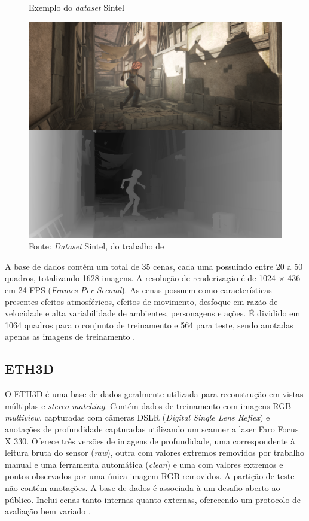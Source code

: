 \begin{figure}[h]
    \centering
    \caption{Exemplo do \textit{dataset} Sintel}
    \includegraphics[width=.6\textwidth]{fig/sintel_example.png}
    \caption*{Fonte: \textit{Dataset} Sintel, do trabalho de }
    \label{fig:sintelexample}
\end{figure}


A base de dados contém um total de 35 cenas, cada uma possuindo entre 20 a 50 quadros, totalizando 1628 imagens. A resolução de renderização é de 1024 $\times$ 436 em 24 FPS (\textit{Frames Per Second}). As cenas possuem como características presentes efeitos atmosféricos, efeitos de movimento, desfoque em razão de velocidade e alta variabilidade de ambientes, personagens e ações. É dividido em 1064 quadros para o conjunto de treinamento e 564 para teste, sendo anotadas apenas as imagens de treinamento \cite{wulff2012lessons}. 



\subsection{ETH3D}

O ETH3D é uma base de dados geralmente utilizada para reconstrução em vistas múltiplas e \textit{stereo matching}. Contém dados de treinamento com imagens RGB \textit{multiview}, capturadas com câmeras DSLR (\textit{Digital Single Lens Reflex}) e anotações de profundidade capturadas utilizando um scanner a laser Faro Focus X 330. Oferece três versões de imagens de profundidade, uma correspondente à leitura bruta do sensor (\textit{raw}), outra com valores extremos removidos por trabalho manual e uma ferramenta automática (\textit{clean}) e uma com valores extremos e pontos observados por uma única imagem RGB removidos. A partição de teste não contém anotações. A base de dados é associada à um desafio aberto ao público. Inclui cenas tanto internas quanto externas, oferecendo um protocolo de avaliação bem variado \cite{lahiri2024deep} \cite{schops2019bad}. 

